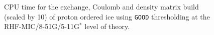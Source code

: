 \commentoutA{\documentclass[prb,aps,nobibnotes,twocolumn,doublespace,twocolumngrid,superbib,showpacs]{revtex4}}
\begin{document}
{\clearpage
\begin{figure}
\caption{CPU time for the exchange, Coulomb and density 
matrix build (scaled by 10) of proton ordered ice using {\tt GOOD}
thresholding at the RHF-MIC/8-51G/5-11G$^*$ level of theory.}
\label{IceScaling}
{\centering  {} \par} 
\end{figure}

}
\end{document}
